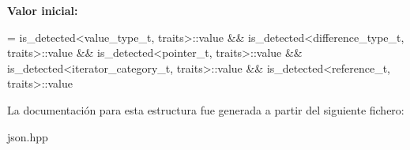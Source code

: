 {\bfseries Valor inicial\+:}
\begin{DoxyCode}
=
        is\_detected<value\_type\_t, traits>::value &&
        is\_detected<difference\_type\_t, traits>::value &&
        is\_detected<pointer\_t, traits>::value &&
        is\_detected<iterator\_category\_t, traits>::value &&
        is\_detected<reference\_t, traits>::value
\end{DoxyCode}


La documentación para esta estructura fue generada a partir del siguiente fichero\+:\begin{DoxyCompactItemize}
\item 
json.\+hpp\end{DoxyCompactItemize}
